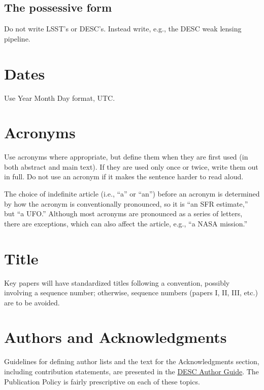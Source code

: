 \documentclass[letterpaper,11pt]{article}
\begin{document}
\subsection{The possessive form}

Do not write LSST's or DESC's.  Instead write, e.g., the DESC weak lensing pipeline.

\section{Dates}

Use Year Month Day format, UTC.


\section{Acronyms}

Use acronyms where appropriate, but define them when they are first used
(in both
abstract and main text).  If they are used only once or twice, write them out
in full.  Do not use an acronym if it makes the sentence harder to read aloud.

The choice of indefinite article (i.e., ``a'' or ``an'') before an
acronym is determined by how the acronym is conventionally pronounced,
so it is ``an SFR estimate,'' but ``a UFO.''  Although most acronyms are
pronounced as a series of letters, there are exceptions, which can also affect
the article, e.g., ``a NASA mission.''

\section{Title}

Key papers will have standardized titles following a  convention, possibly involving a sequence number; otherwise, sequence numbers (papers I, II, III, etc.) are to be avoided.

\section{Authors and Acknowledgments}

Guidelines for defining author lists and the text for the Acknowledgments section, including contribution statements, are presented in the \href{https://github.com/LSSTDESC/Author_Guide/blob/compiled/Author_Guide.pdf}{DESC Author Guide}.  The Publication Policy is fairly prescriptive on each of these topics.
\end{document}
